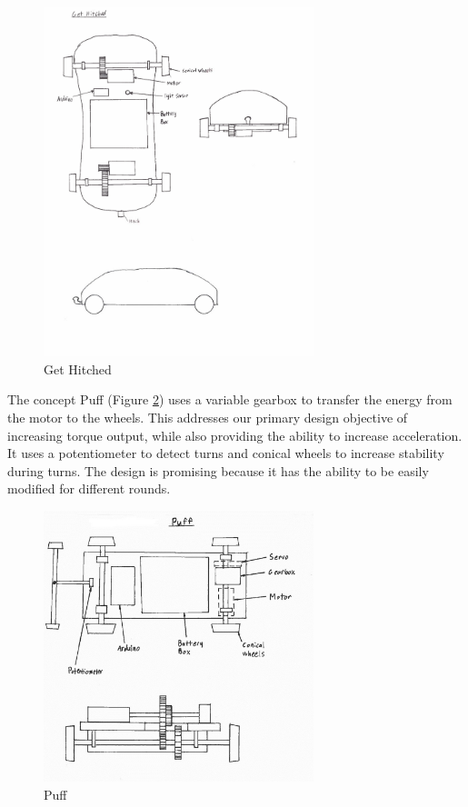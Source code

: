 \documentclass[class=../report, crop=false]{standalone}
\begin{document}
\begin{figure}[H]
	\centering
	\includegraphics[width=0.7\textwidth]{../res/img/gethitched}
	\caption{Get Hitched}
	\label{fig:gethitched}
\end{figure}

\clearpage

The concept Puff (Figure \ref{fig:puff}) uses a variable gearbox to transfer the energy from the motor to the wheels.
This addresses our primary design objective of increasing torque output, while also providing the ability to increase acceleration.
It uses a potentiometer to detect turns and conical wheels to increase stability during turns.
The design is promising because it has the ability to be easily modified for different rounds.

\begin{figure}[H]
	\centering
	\includegraphics[width=0.7\textwidth]{../res/img/puff}
	\caption{Puff}
	\label{fig:puff}
\end{figure}
\end{document}

